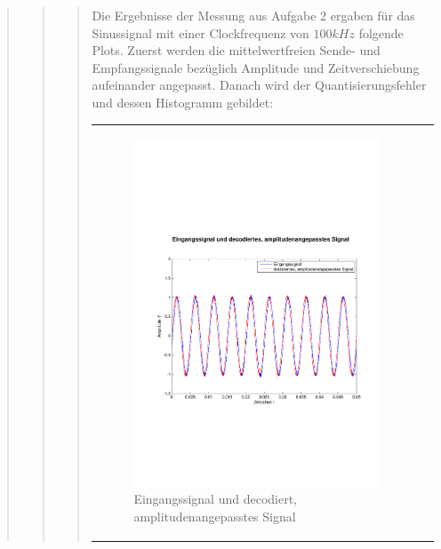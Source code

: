 \begin{quote}
\begin{quote}
\begin{quote}
    
            Die Ergebnisse der Messung aus Aufgabe 2 ergaben für das Sinussignal mit
            einer Clockfrequenz von $100 kHz$ folgende Plots. Zuerst werden die
            mittelwertfreien Sende- und Empfangssignale bezüglich Amplitude und
            Zeitverschiebung aufeinander angepasst. Danach wird der
            Quantisierungsfehler und dessen Histogramm gebildet:
    
            \begin{center}
                \begin{tabular}{ll}
                
                \hspace{-4cm}
                    \begin{minipage}{0.6\textwidth}
                        \begin{figure}[H]
                            \includegraphics[scale=0.4, trim = 0.8cm 7cm 0.8cm
                            7.5cm, clip]
                            {./Bilder/sin100_Eingang_vs_DecodiertAmpl-angepasst}
                              \caption{Eingangssignal und decodiert, \newline
                              amplitudenangepasstes Signal}
                        \end{figure}
                    \end{minipage}
                    

\end{tabular}
\end{center}
\end{quote}
\end{quote}
\end{quote}
